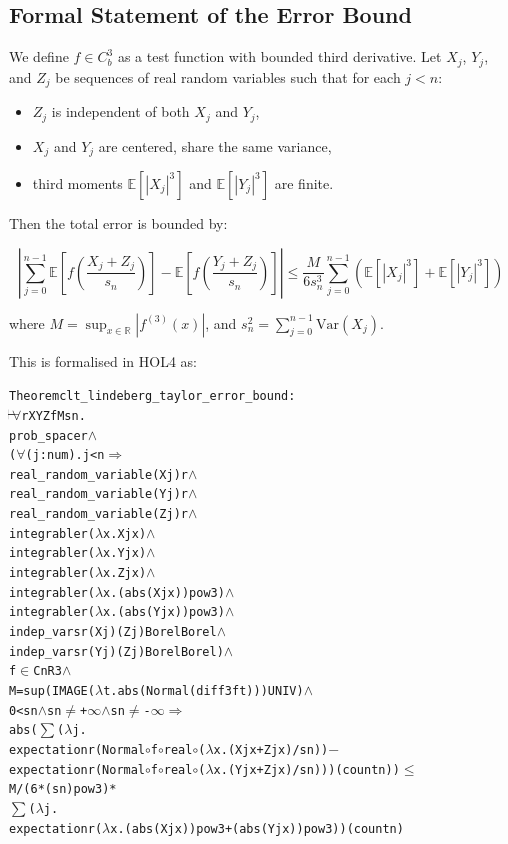 \subsection{Formal Statement of the Error Bound}

We define $f \in C^3_b$ as a test function with bounded third derivative. Let $X_j$, $Y_j$, and $Z_j$ be sequences of real random variables such that for each $j < n$:
\begin{itemize}
    \item $Z_j$ is independent of both $X_j$ and $Y_j$,
    \item $X_j$ and $Y_j$ are centered, share the same variance,
    \item third moments $\mathbb{E}[|X_j|^3]$ and $\mathbb{E}[|Y_j|^3]$ are finite.
\end{itemize}


Then the total error is bounded by:

\[
\left| \sum_{j=0}^{n-1}
\mathbb{E}\left[f\left(\frac{X_j + Z_j}{s_n} \right)\right] -
\mathbb{E}\left[f\left(\frac{Y_j + Z_j}{s_n} \right)\right]
\right| \leq \frac{M}{6 s_n^3}
\sum_{j=0}^{n-1} \left( \mathbb{E}[|X_j|^3] + \mathbb{E}[|Y_j|^3] \right)
\]

where $M = \sup_{x \in \mathbb{R}} |f^{(3)}(x)|$, and $s_n^2 = \sum_{j=0}^{n-1} \mathrm{Var}(X_j)$.

This is formalised in HOL4 as:

\begin{hol}
\begin{alltt}
Theorem clt\_lindeberg\_taylor\_error\_bound :
\(\!\!\!{\turn}\!\!\!\!\) \(\forall\)r X Y Z f M s n.
prob\_space r \(\land\)
(\(\forall\)(j :num). j < n \(\Rightarrow\)
  real\_random\_variable (X j) r \(\land\)
  real\_random\_variable (Y j) r \(\land\)
  real\_random\_variable (Z j) r \(\land\)
  integrable r (\(\lambda\)x. X j x) \(\land\)
  integrable r (\(\lambda\)x. Y j x) \(\land\)
  integrable r (\(\lambda\)x. Z j x) \(\land\)
  integrable r (\(\lambda\)x. (abs (X j x)) pow 3) \(\land\)
  integrable r (\(\lambda\)x. (abs (Y j x)) pow 3) \(\land\)
  indep\_vars r (X j) (Z j) Borel Borel \(\land\)
  indep\_vars r (Y j) (Z j) Borel Borel) \(\land\)
f \(\in\) CnR 3 \(\land\)
M = sup (IMAGE (\(\lambda\)t. abs (Normal (diff 3 f t))) UNIV) \(\land\)
0 < s n \(\land\) s n \(\ne\) +\(\infty\) \(\land\) s n \(\ne\) -\(\infty\) \(\Rightarrow\)
abs (\(\sum\) (\(\lambda\)j.
  expectation r (Normal \(\circ\) f \(\circ\) real \(\circ\) (\(\lambda\)x. (X j x + Z j x) / s n)) \({-}\)
  expectation r (Normal \(\circ\) f \(\circ\) real \(\circ\) (\(\lambda\)x. (Y j x + Z j x) / s n))) (count n)) \(\le\)
M / (6 * (s n) pow 3) *
\(\sum\) (\(\lambda\)j.
  expectation r (\(\lambda\)x. (abs (X j x)) pow 3 + (abs (Y j x)) pow 3)) (count n)
\end{alltt}
\end{hol}

